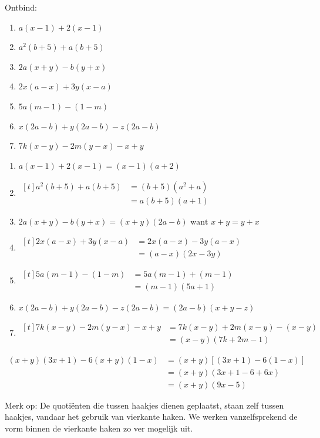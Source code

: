 \documentclass{bis}
\begin{document}
\begin{exercise}
Ontbind:
\begin{enumerate}
  \item $a (x - 1) + 2 (x - 1)$
  \item $a^2 (b + 5) + a (b + 5)$
  \item $2a (x + y) - b (y + x)$
  \item $2x (a - x) + 3y (x - a)$
  \item $5a (m - 1) - (1 - m)$
  \item $x (2a - b) + y (2a - b) - z (2a - b)$
  \item $7k (x - y) - 2m (y - x) - x + y$
\end{enumerate}
\end{exercise}

\begin{solution}
\begin{enumerate}
  \item $a (x - 1) + 2 (x - 1)=(x - 1) (a + 2)$
  \item $\begin{aligned}[t]a^2 (b + 5) + a (b + 5)
  &=(b + 5) (a^2 + a)\\
  &=a (b + 5) (a + 1)\end{aligned}$
  \item $2a (x + y) - b (y + x)=(x + y) (2a - b) \text{ want } x + y = y + x$
  \item $\begin{aligned}[t]2x (a - x) + 3y (x - a)
  &=2x (a - x) - 3y (a - x)\\
  &=(a - x) (2x - 3y)\end{aligned}$
  \item $\begin{aligned}[t]5a (m - 1) - (1 - m)
  &=5a (m - 1) + (m - 1)\\
  &=(m - 1) (5a + 1)\end{aligned}$
  \item $x (2a - b) + y (2a - b) - z (2a - b)=(2a - b) (x + y - z)$
  \item $\begin{aligned}[t]7k (x - y) - 2m (y - x) - x + y
  &=7k (x - y) + 2m (x - y) - (x - y)\\
  &= (x - y) (7 k + 2 m - 1)\end{aligned}$
\end{enumerate}
\end{solution}

\begin{voorbeeld}
\begin{align*}
(x + y) (3x + 1) - 6 (x + y) (1 - x)
& = (x + y) [(3x + 1) - 6 (1 - x)]\\
&= (x + y) (3x + 1 - 6 + 6x)\\
&= (x + y) (9x - 5)
\end{align*}

Merk op: De quotiënten die tussen haakjes dienen geplaatst, staan zelf tussen haakjes, vandaar het gebruik van vierkante haken. We werken vanzelfsprekend de vorm binnen de vierkante haken zo ver mogelijk uit.
\end{voorbeeld}
\end{document}
